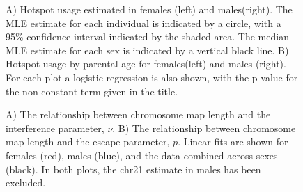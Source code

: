 \begin{figure}[!h]
    \caption[\textbf{Hotspot usage between sexes.}]{
        A) Hotspot usage estimated in females (left) and males(right). 
        The MLE estimate for each individual is indicated by a circle, with a 95\% confidence interval indicated by the shaded area.
        The median MLE estimate for each sex is indicated by a vertical black line.
        B) Hotspot usage by parental age for females(left) and males (right).
        For each plot a logistic regression is also shown, with the p-value for the non-constant term given in the title.  
       \label{fig:cointFS7}}
\end{figure}

\begin{figure}[!h]
    \caption[\textbf{The relationship between map length and interference parameters.}]{ 
        A) The relationship between chromosome map length and the interference parameter, $\nu$.
        B) The relationship between chromosome map length and the escape parameter, $p$.
        Linear fits are shown for females (red), males (blue), and the data combined across sexes (black).
        In both plots, the chr21 estimate in males has been excluded.  
       \label{fig:cointFS8}}
\end{figure}

\begin{figure}[!h]
\end{figure}

\begin{figure}[!h]
\end{figure}

